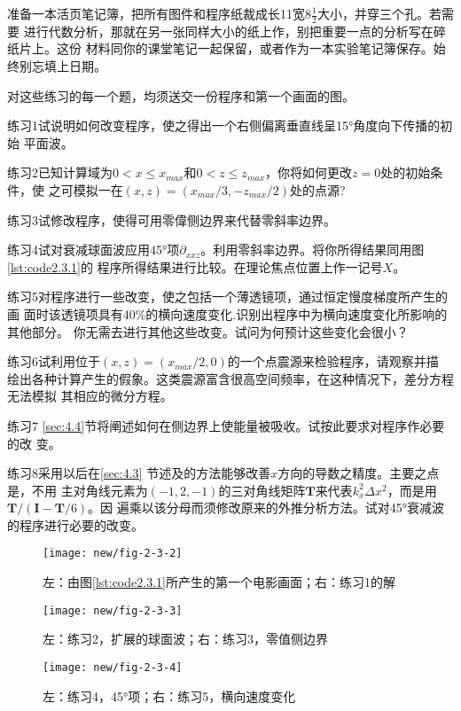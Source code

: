 准备一本活页笔记簿，把所有图件和程序纸裁成长11宽$8\frac{1}{2}$大小，并穿三个孔。若需要
进行代数分析，那就在另一张同样大小的纸上作，别把重要一点的分析写在碎纸片上。这份
材料同你的课堂笔记一起保留，或者作为一本实验笔记簿保存。始终别忘填上日期。

对这些练习的每一个题，均须送交一份程序和第一个画面的图。

练习1试说明如何改变程序，使之得出一个右侧偏离垂直线呈15°角度向下传播的初始
平面波。

练习2已知计算域为$0<x\leq x_{max}$和$0<z\leq z_{max}$，你将如何更改$z=0$处的初始条件，使
之可模拟一在$(x,z) =(x_{max}/3,-z_{max}/2)$处的点源?

练习3试修改程序，使得可用零偉侧边界来代替零斜率边界。

练习4试对衰减球面波应用45°项$\partial _{xxz}$。利用零斜率边界。将你所得结果同用图\ref{lst:code2.3.1}的
程序所得结果进行比较。在理论焦点位置上作一记号$X$。

练习5对程序进行一些改变，使之包括一个薄透镜项，通过恒定慢度梯度所产生的画
面时该透镜项具有40\%的横向速度变化.识别出程序中为横向速度变化所影响的其他部分。
你无需去进行其他这些改变。试问为何预计这些变化会很小？

练习6试利用位于$(x,z)=(x_{max}/2,0)$的一个点震源来检验程序，请观察并描
绘出各种计算产生的假象。这类震源富含很高空间频率，在这种情况下，差分方程无法模拟
其相应的微分方程。

练习7 \ref{sec:4.4}节将阐述如何在侧边界上使能量被吸收。试按此要求对程序作必要的改 变。

练习8采用以后在\ref{sec:4.3}
节述及的方法能够改善$x$方向的导数之精度。主要之点是，不用
主对角线元素为$(-1,2,-1)$的三对角线矩阵$\mathbf{T}$来代表$k_x^2\Delta x^2$，而是用$\mathbf{T}/(\mathbf{I}-\mathbf{T}/6)$。因
遍乘以该分母而须修改原来的外推分析方法。试对45°衰减波的程序进行必要的改变。
\begin{figure}[H]
\centering
\texttt{[image: new/fig-2-3-2]}
\caption[2-3-2]{左：由图\ref{lst:code2.3.1}所产生的第一个电影画面；右：练习1的解}
\label{fig:new/fig-2-3-2}
\end{figure}

\begin{figure}[H]
\centering
\texttt{[image: new/fig-2-3-3]}
\caption[2-3-3]{左：练习2，扩展的球面波；右：练习3，零值侧边界}
\label{fig:new/fig-2-3-3}
\end{figure}

\begin{figure}[H]
\centering
\texttt{[image: new/fig-2-3-4]}
\caption[2-3-4]{左：练习4，45°项；右：练习5，横向速度变化}
\label{fig:new/fig-2-3-4}
\end{figure}

